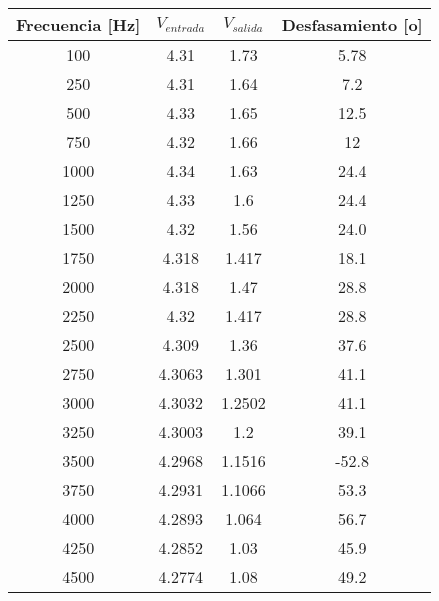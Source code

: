 \documentclass{article}
\begin{document}
\begin{table}[h!]
\centering

\begin{tabular}{|c|c|c|c|}
\hline
Frecuencia [Hz] & $V_{entrada}$ & $V_{salida}$ & Desfasamiento [o] \\ \hline
100                 & 4.31          & 1.73         & 5.78                 \\ \hline
250                 & 4.31          & 1.64         & 7.2                  \\ \hline
500                 & 4.33          & 1.65         & 12.5                 \\ \hline
750                 & 4.32          & 1.66         & 12                   \\ \hline
1000                & 4.34          & 1.63         & 24.4                 \\ \hline
1250                & 4.33          & 1.6          & 24.4                      \\ \hline
1500                & 4.32          & 1.56         & 24.0                 \\ \hline
1750                & 4.318         & 1.417        & 18.1                 \\ \hline
2000                & 4.318         & 1.47         & 28.8                 \\ \hline
2250                & 4.32          & 1.417        & 28.8                     \\ \hline
2500                & 4.309         & 1.36         & 37.6                 \\ \hline
2750                & 4.3063        & 1.301        & 41.1                 \\ \hline
3000                & 4.3032        & 1.2502       &  41.1                    \\ \hline
3250                & 4.3003        & 1.2          & 39.1                 \\ \hline
3500                & 4.2968        & 1.1516       & -52.8                \\ \hline
3750                & 4.2931        & 1.1066       & 53.3                 \\ \hline
4000                & 4.2893        & 1.064        & 56.7                 \\ \hline
4250                & 4.2852        & 1.03         & 45.9                 \\ \hline
4500                & 4.2774        & 1.08         & 49.2                 \\ \hline

\end{tabular}
\end{table}
\end{document}
